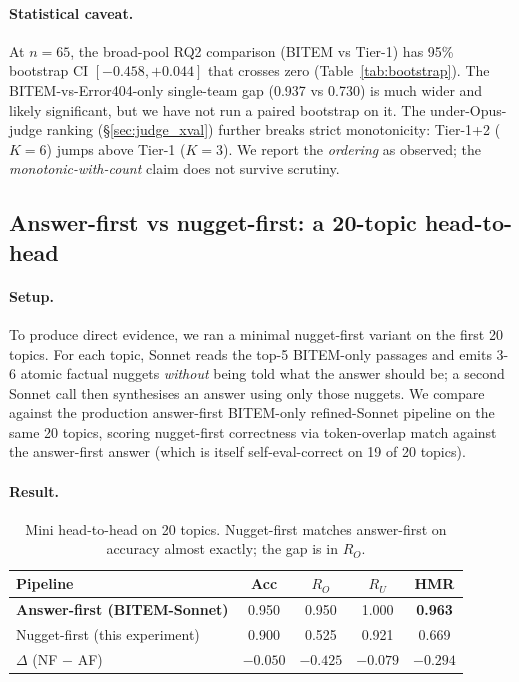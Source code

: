 \documentclass[11pt,a4paper]{article}
\newcommand{\HMR}{\textsc{HMR}}
\begin{document}
\paragraph{Statistical caveat.} At $n=65$, the broad-pool RQ2
comparison (BITEM vs Tier-1) has 95\% bootstrap CI
$[-0.458, +0.044]$ that crosses zero (Table~\ref{tab:bootstrap}).
The BITEM-vs-Error404-only single-team gap (0.937 vs 0.730) is
much wider and likely significant, but we have not run a paired
bootstrap on it. The under-Opus-judge ranking
(\S\ref{sec:judge_xval}) further breaks strict monotonicity:
Tier-1+2 ($K=6$) jumps above Tier-1 ($K=3$). We report the
\emph{ordering} as observed; the \emph{monotonic-with-count} claim
does not survive scrutiny.

\subsection{Answer-first vs nugget-first: a 20-topic head-to-head}\label{sec:rq3}

\paragraph{Setup.} To produce direct evidence, we ran a minimal
nugget-first variant on the first 20 topics. For each topic, Sonnet
reads the top-5 BITEM-only passages and emits 3-6 atomic factual
nuggets \emph{without} being told what the answer should be; a
second Sonnet call then synthesises an answer using only those
nuggets. We compare against the production answer-first BITEM-only
refined-Sonnet pipeline on the same 20 topics, scoring nugget-first
correctness via token-overlap match against the answer-first answer
(which is itself self-eval-correct on 19 of 20 topics).

\paragraph{Result.}
\begin{table}[h]
\centering
\caption{Mini head-to-head on 20 topics. Nugget-first matches
answer-first on accuracy almost exactly; the gap is in $R_O$.}
\label{tab:nugget_first}
\begin{tabular}{lcccc}
\toprule
Pipeline & Acc & $R_O$ & $R_U$ & \HMR \\
\midrule
\textbf{Answer-first (BITEM-Sonnet)} & 0.950 & 0.950 & 1.000 & \textbf{0.963} \\
Nugget-first (this experiment)        & 0.900 & 0.525 & 0.921 & 0.669 \\
\midrule
$\Delta$ (NF $-$ AF)                  & $-0.050$ & $-0.425$ & $-0.079$ & $-0.294$ \\
\bottomrule
\end{tabular}
\end{table}
\end{document}
